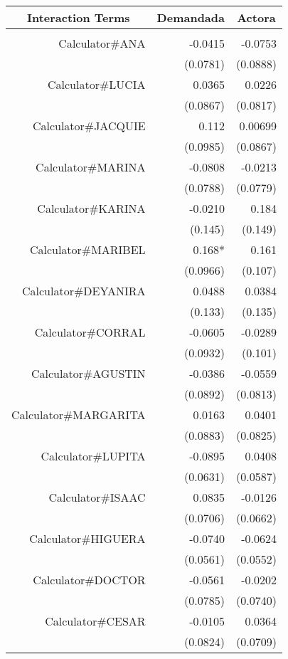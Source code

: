 \begin{tabular}{rrr}
\toprule
\multicolumn{1}{c}{Interaction Terms} & \multicolumn{1}{c}{Demandada} & \multicolumn{1}{c}{Actora} \\
\midrule
      &       &  \\
Calculator\#ANA & -0.0415 & -0.0753 \\
      & (0.0781) & (0.0888) \\
Calculator\#LUCIA & 0.0365 & 0.0226 \\
      & (0.0867) & (0.0817) \\
Calculator\#JACQUIE & 0.112 & 0.00699 \\
      & (0.0985) & (0.0867) \\
Calculator\#MARINA & -0.0808 & -0.0213 \\
      & (0.0788) & (0.0779) \\
Calculator\#KARINA & -0.0210 & 0.184 \\
      & (0.145) & (0.149) \\
Calculator\#MARIBEL & 0.168* & 0.161 \\
      & (0.0966) & (0.107) \\
Calculator\#DEYANIRA & 0.0488 & 0.0384 \\
      & (0.133) & (0.135) \\
Calculator\#CORRAL & -0.0605 & -0.0289 \\
      & (0.0932) & (0.101) \\
Calculator\#AGUSTIN & -0.0386 & -0.0559 \\
      & (0.0892) & (0.0813) \\
Calculator\#MARGARITA & 0.0163 & 0.0401 \\
      & (0.0883) & (0.0825) \\
Calculator\#LUPITA & -0.0895 & 0.0408 \\
      & (0.0631) & (0.0587) \\
Calculator\#ISAAC & 0.0835 & -0.0126 \\
      & (0.0706) & (0.0662) \\
Calculator\#HIGUERA & -0.0740 & -0.0624 \\
      & (0.0561) & (0.0552) \\
Calculator\#DOCTOR & -0.0561 & -0.0202 \\
      & (0.0785) & (0.0740) \\
Calculator\#CESAR & -0.0105 & 0.0364 \\
      & (0.0824) & (0.0709) \\
\bottomrule
\end{tabular}%
